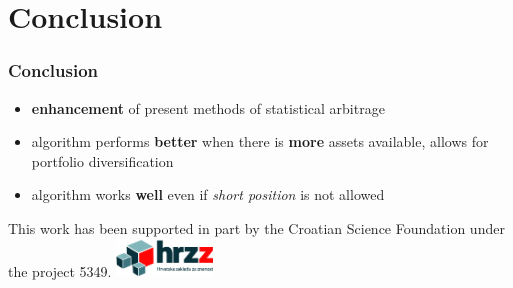 \documentclass[11pt]{beamer}
\begin{document}

  \section{Conclusion}
  \begin{frame}
    \frametitle{Conclusion}
    \begin{itemize}
      \item \textbf{enhancement} of present methods of statistical arbitrage
      \item algorithm performs \textbf{better} when there is \textbf{more} assets available, allows for portfolio diversification
      \item algorithm works \textbf{well} even if \emph{short position} is not allowed
    \end{itemize}
	\vfill
    \tiny{This work has been supported in part by the Croatian Science Foundation under the project 5349.}
    \includegraphics[height=1cm]{graphics/HRZZ.jpg}
  \end{frame}
\end{document}
